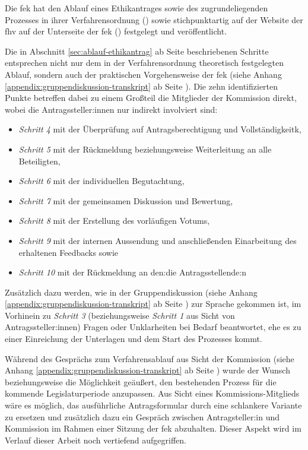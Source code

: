 \documentclass[a4paper,12pt,twoside]{scrreprt}
\begin{document}
Die \acl{fek} hat den Ablauf eines Ethikantrages sowie des zugrundeliegenden Prozesses in ihrer Verfahrensordnung (\cite{forschungsethik-kommission_der_fachhochschule_vorarlberg_verfahrensordnung_2020}) sowie stichpunktartig auf der Website der \ac{fhv} auf der Unterseite der \ac{fek} (\cite{fachhochschule_vorarlberg_gmbh_forschungsethik-kommission_2021}) festgelegt und veröffentlicht.

Die in Abschnitt \ref{sec:ablauf-ethikantrag} ab Seite \pageref{sec:ablauf-ethikantrag} beschriebenen Schritte entsprechen nicht nur dem in der Verfahrensordnung theoretisch festgelegten Ablauf, sondern auch der praktischen Vorgehensweise der \ac{fek} (siehe Anhang \ref{appendix:gruppendiskussion-transkript} ab Seite \pageref{appendix:gruppendiskussion-transkript}). Die zehn identifizierten Punkte betreffen dabei zu einem Großteil die Mitglieder der Kommission direkt, wobei die Antragssteller:innen nur indirekt involviert sind:
\begin{itemize}
    \item \textit{Schritt 4} mit der Überprüfung auf Antragsberechtigung und Vollständigkeitk,
    \item \textit{Schritt 5} mit der Rückmeldung beziehungsweise Weiterleitung an alle Beteiligten,
    \item \textit{Schritt 6} mit der individuellen Begutachtung,
    \item \textit{Schritt 7} mit der gemeinsamen Diskussion und Bewertung,
    \item \textit{Schritt 8} mit der Erstellung des vorläufigen Votums,
    \item \textit{Schritt 9} mit der internen Aussendung und anschließenden Einarbeitung des erhaltenen Feedbacks sowie
    \item \textit{Schritt 10} mit der Rückmeldung an den:die Antragsstellende:n
\end{itemize}

\noindent Zusätzlich dazu werden, wie in der Gruppendiskussion (siehe Anhang \ref{appendix:gruppendiskussion-transkript} ab Seite \pageref{appendix:gruppendiskussion-transkript}) zur Sprache gekommen ist, im Vorhinein zu \textit{Schritt 3} (beziehungsweise \textit{Schritt 1} aus Sicht von Antragssteller:innen) Fragen oder Unklarheiten bei Bedarf beantwortet, ehe es zu einer Einreichung der Unterlagen und dem Start des Prozesses kommt.

\medskip

Während des Gesprächs zum Verfahrensablauf aus Sicht der Kommission (siehe Anhang \ref{appendix:gruppendiskussion-transkript} ab Seite \pageref{appendix:gruppendiskussion-transkript}) wurde der Wunsch beziehungsweise die Möglichkeit geäußert, den bestehenden Prozess für die kommende Legislaturperiode anzupassen. Aus Sicht eines Kommissions-Mitglieds wäre es möglich, das ausführliche Antragsformular durch eine schlankere Variante zu ersetzen und zusätzlich dazu ein Gespräch zwischen Antragsteller:in und Kommission im Rahmen einer Sitzung der \ac{fek} abzuhalten. Dieser Aspekt wird im Verlauf dieser Arbeit noch vertiefend aufgegriffen.
\end{document}
